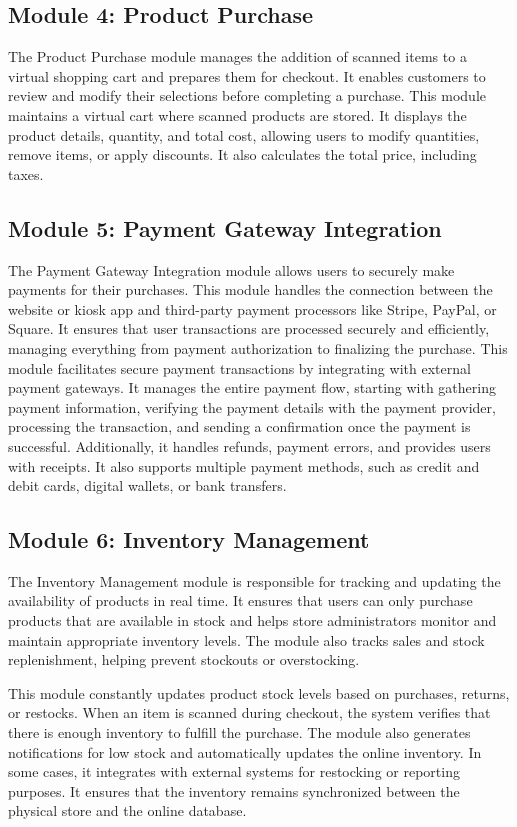 \documentclass[conference]{IEEEtran}
\begin{document}
\subsection{Module 4: Product Purchase} 
The Product Purchase module manages the addition of scanned items to a virtual shopping cart and prepares them for checkout. It enables customers to review and modify their selections before completing a purchase.
This module maintains a virtual cart where scanned products are stored. It displays the product details, quantity, and total cost, allowing users to modify quantities, remove items, or apply discounts. It also calculates the total price, including taxes.
\subsection{Module 5: Payment Gateway Integration} 
The Payment Gateway Integration module allows users to securely make payments for their purchases. This module handles the connection between the website or kiosk app and third-party payment processors like Stripe, PayPal, or Square. It ensures that user transactions are processed securely and efficiently, managing everything from payment authorization to finalizing the purchase.
This module facilitates secure payment transactions by integrating with external payment gateways. It manages the entire payment flow, starting with gathering payment information, verifying the payment details with the payment provider, processing the transaction, and sending a confirmation once the payment is successful. Additionally, it handles refunds, payment errors, and provides users with receipts. It also supports multiple payment methods, such as credit and debit cards, digital wallets, or bank transfers.

\subsection{Module 6: Inventory Management}
The Inventory Management module is responsible for tracking and updating the availability of products in real time. It ensures that users can only purchase products that are available in stock and helps store administrators monitor and maintain appropriate inventory levels. The module also tracks sales and stock replenishment, helping prevent stockouts or overstocking.

This module constantly updates product stock levels based on purchases, returns, or restocks. When an item is scanned during checkout, the system verifies that there is enough inventory to fulfill the purchase. The module also generates notifications for low stock and automatically updates the online inventory. In some cases, it integrates with external systems for restocking or reporting purposes. It ensures that the inventory remains synchronized between the physical store and the online database.
\end{document}
